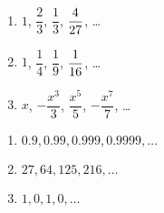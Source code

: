 \begin{multicols}{3}
\begin{enumerate}
\setcounter{enumi}{\value{HW}}

\item $1$, $\dfrac{2}{3}$, $\dfrac{1}{3}$, $\dfrac{4}{27} \vphantom{\dfrac{x^7}{7}}$, \ldots
\item $1$, $\dfrac{1}{4}$, $\dfrac{1}{9}$, $\dfrac{1}{16} \vphantom{-\dfrac{x^7}{7}}$, \ldots
\item $x$, $-\dfrac{x^3}{3}$, $\dfrac{x^5}{5}$, $-\dfrac{x^7}{7}$, \ldots

\setcounter{HW}{\value{enumi}}
\end{enumerate}
\end{multicols}

\begin{multicols}{3}
\begin{enumerate}
\setcounter{enumi}{\value{HW}}


\item $0.9, 0.99, 0.999, 0.9999, \ldots$
\item $27, 64, 125, 216, \ldots$
\item $1, 0, 1, 0, \ldots$ \label{nthtermlast}

\setcounter{HW}{\value{enumi}}
\end{enumerate}
\end{multicols}


